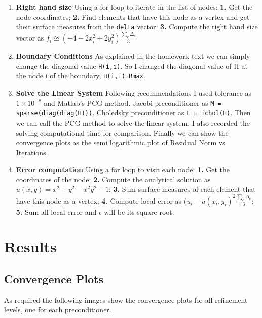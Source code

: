 \documentclass[a4paper, 11pt]{article}
\begin{document}
\begin{enumerate}
				\item  \textbf{Right hand size}
					Using a for loop to iterate in the list of nodes:
					\subitem \textbf{1.} Get the node coordinates;
					\subitem \textbf{2.} Find elements that have this node as a vertex and get their surface measures from the \texttt{delta} vector;
					\subitem \textbf{3.} Compute the right hand size vector as $f_i \approxeq (-4 +2x_i^2 + 2y_i^2)  \frac{\sum_e \Delta_e}{3} $
				
				\item \textbf{Boundary Conditions}
					As explained in the homework text we can simply change the diagonal value \texttt{H(i,i)}.
					So I changed the diagonal value of H at the node i of the boundary, \texttt{H(i,i)=Rmax}.
				
				\item \textbf{Solve the Linear System}
					Following recommendations I used tolerance as $ 1 \times 10^{-8} $ and Matlab's PCG method.
					Jacobi preconditioner as \texttt{M = sparse(diag(diag(H)))}.
					Choledsky preconditioner as \texttt{L = ichol(H)}.
					Then we can call the PCG method to solve the linear system.
					I also recorded the solving computational time for comparison.
					Finally we can show the convergence plots as the semi logarithmic plot of Residual Norm vs Iterations.
				
				\item \textbf{Error computation} Using a for loop to visit each node:
					\subitem \textbf{1.} Get the coordinates of the node;
					\subitem \textbf{2.} Compute the analytical solution as $u(x,y) = x^2 + y^2 - x^2y^2 - 1$;
					\subitem \textbf{3.} Sum surface measures of each element that have this node as a vertex;
					\subitem \textbf{4.} Compute local error as $ (u_i - u(x_i,y_i)^ 2 \frac{\sum_e \Delta_e}{3} $;
					\subitem \textbf{5.} Sum all local error and $ \epsilon $ will be its square root.	
			\end{enumerate}
			
	
		
		\section{Results}
		
			\subsection{Convergence Plots}
			
				As required the following images show the convergence plots for all refinement levels, one for each preconditioner.
				
\end{document}
